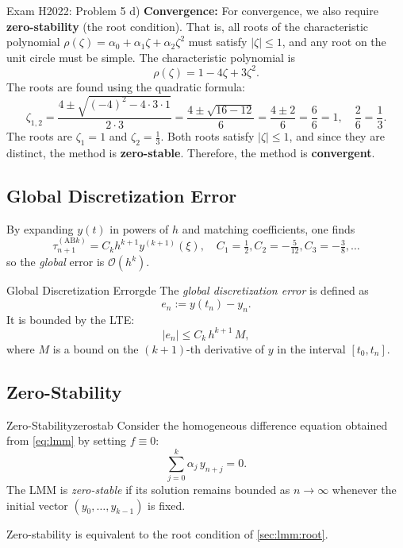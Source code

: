 \begin{example}{Exam H2022: Problem 5 d)}{}
  \textbf{Convergence:}
  For convergence, we also require \textbf{zero-stability} (the root condition). That is, all roots of the characteristic polynomial $\rho(\zeta) = \alpha_0 + \alpha_1 \zeta + \alpha_2 \zeta^2$ must satisfy $|\zeta| \leq 1$, and any root on the unit circle must be simple.
  The characteristic polynomial is
  \[
    \rho(\zeta) = 1 - 4\zeta + 3\zeta^2.
  \]
  The roots are found using the quadratic formula:
  \[
    \zeta_{1,2} = \frac{4 \pm \sqrt{(-4)^2 - 4 \cdot 3 \cdot 1}}{2 \cdot 3} = \frac{4 \pm \sqrt{16 - 12}}{6} = \frac{4 \pm 2}{6} = \frac{6}{6} = 1, \quad \frac{2}{6} = \frac{1}{3}.
  \]
  The roots are $\zeta_1 = 1$ and $\zeta_2 = \frac{1}{3}$.
  Both roots satisfy $|\zeta| \leq 1$, and since they are distinct, the method is \textbf{zero-stable}.
  Therefore, the method is \textbf{convergent}.
\end{example}

\subsection{Global Discretization Error}
\label{sec:lmm:global}
By expanding $y(t)$ in powers of $h$ and matching coefficients, one
finds
\[
  \tau_{n+1}^{(\text{AB}k)} = C_k h^{k+1} y^{(k+1)}(\xi),
  \quad
  C_1 = \tfrac12, C_2 = -\tfrac5{12}, C_3 = -\tfrac3{8},\dots
\]
so the \emph{global} error is $\mathcal{O}(h^{k})$.

\begin{definition}{Global Discretization Error}{gde}
  The \emph{global discretization error} is defined as
  \[
    e_n := y(t_n) - y_n.
  \]
  It is bounded by the LTE:
  \[
    |e_n| \leq C_k\,h^{k+1}\,M,
  \]
  where $M$ is a bound on the $(k+1)$-th derivative of $y$ in the interval $[t_0,t_n]$.
\end{definition}

\subsection{Zero-Stability}
\label{sec:lmm:zerostab}
\begin{definition}{Zero-Stability}{zerostab}
  Consider the homogeneous difference equation obtained from \eqref{eq:lmm} by setting $f\equiv0$:
  \[
    \sum_{j=0}^{k}\alpha_j\,y_{n+j}=0.
  \]
  The LMM is \emph{zero-stable} if its solution remains bounded as $n\to\infty$ whenever the initial vector $(y_0,\dots,y_{k-1})$ is fixed.

\end{definition}
Zero-stability is equivalent to the root condition of \autoref{sec:lmm:root}.

